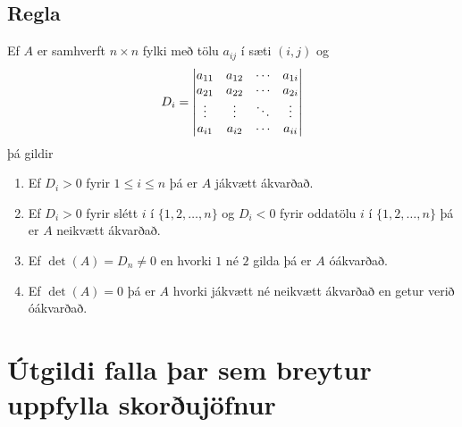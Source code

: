 \documentclass[a4paper,10pt,icelandic]{sphinxmanual}
\begin{document}
\subsection{Regla}
\label{Kafli3:regla}
Ef \(A\) er samhverft \(n \times n\) fylki með tölu
\(a_{ij}\) í sæti \((i,j)\) og
\begin{gather}
\begin{split}D_i = \begin{vmatrix}
        a_{11} & a_{12} & \cdots & a_{1i} \\
        a_{21} & a_{22} & \cdots & a_{2i} \\
        \vdots & \vdots & \ddots & \vdots \\
        a_{i1} & a_{i2} & \cdots & a_{ii}
       \end{vmatrix}\end{split}\notag
\end{gather}
þá gildir
\begin{enumerate}
\item {} 
Ef \(D_i > 0\) fyrir \(1\leq i \leq n\) þá er \(A\)
jákvætt ákvarðað.

\item {} 
Ef \(D_i > 0\) fyrir slétt \(i\) í \(\{1,2,\ldots,n\}\)
og \(D_i < 0\) fyrir oddatölu \(i\) í
\(\{1,2,\ldots,n\}\) þá er \(A\) neikvætt ákvarðað.

\item {} 
Ef \(\det(A) = D_n \neq 0\) en hvorki \(1\) né \(2\)
gilda þá er \(A\) óákvarðað.

\item {} 
Ef \(\det(A) = 0\) þá er \(A\) hvorki jákvætt né neikvætt
ákvarðað en getur verið óákvarðað.

\end{enumerate}


\section{Útgildi falla þar sem breytur uppfylla skorðujöfnur}
\label{Kafli3:utgildi-falla-ar-sem-breytur-uppfylla-skorujofnur}
\end{document}
